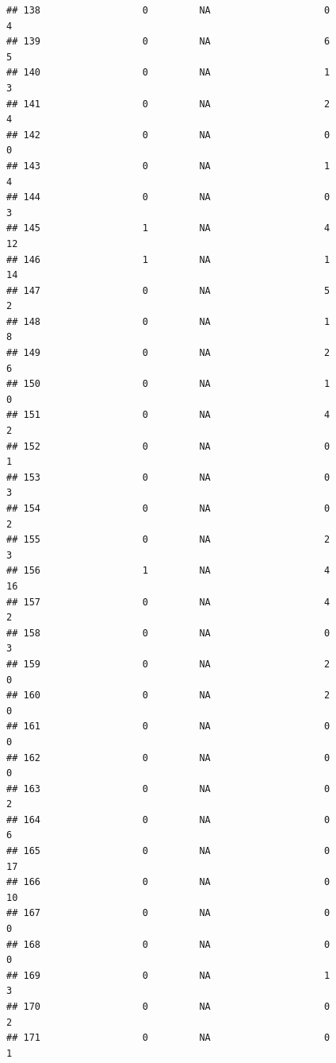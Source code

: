 \documentclass[
]{article}
\begin{document}
\begin{verbatim}
## 138                  0         NA                    0                  4
## 139                  0         NA                    6                  5
## 140                  0         NA                    1                  3
## 141                  0         NA                    2                  4
## 142                  0         NA                    0                  0
## 143                  0         NA                    1                  4
## 144                  0         NA                    0                  3
## 145                  1         NA                    4                 12
## 146                  1         NA                    1                 14
## 147                  0         NA                    5                  2
## 148                  0         NA                    1                  8
## 149                  0         NA                    2                  6
## 150                  0         NA                    1                  0
## 151                  0         NA                    4                  2
## 152                  0         NA                    0                  1
## 153                  0         NA                    0                  3
## 154                  0         NA                    0                  2
## 155                  0         NA                    2                  3
## 156                  1         NA                    4                 16
## 157                  0         NA                    4                  2
## 158                  0         NA                    0                  3
## 159                  0         NA                    2                  0
## 160                  0         NA                    2                  0
## 161                  0         NA                    0                  0
## 162                  0         NA                    0                  0
## 163                  0         NA                    0                  2
## 164                  0         NA                    0                  6
## 165                  0         NA                    0                 17
## 166                  0         NA                    0                 10
## 167                  0         NA                    0                  0
## 168                  0         NA                    0                  0
## 169                  0         NA                    1                  3
## 170                  0         NA                    0                  2
## 171                  0         NA                    0                  1

\end{verbatim}
\end{document}
